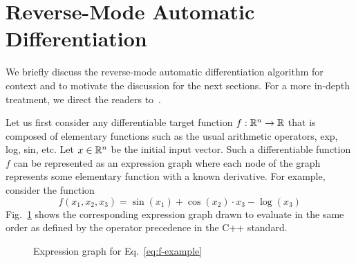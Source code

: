 \section{Reverse-Mode Automatic Differentiation}\label{sec:reverse}

We briefly discuss the reverse-mode automatic differentiation algorithm
for context and to motivate the discussion for the next sections.
For a more in-depth treatment, we direct the readers 
to~\cite{carpenter:2015}\cite{margossian:2018}\cite{griewank:2008}.

Let us first consider any differentiable target function $f: \mathbb{R}^n \to \mathbb{R}$
that is composed of elementary functions such as the usual arithmetic operators,
exp, log, sin, etc.
Let $x \in \mathbb{R}^n$ be the initial input vector.
Such a differentiable function $f$ can be represented as an expression graph
where each node of the graph represents some elementary function with a known derivative.
For example, consider the function 
\begin{equation}
    f(x_1, x_2, x_3) = \sin(x_1) + \cos(x_2) \cdot x_3 - \log(x_3)
    \label{eq:f-example}
\end{equation}
Fig.~\ref{fig:expr-example} shows the corresponding expression graph
drawn to evaluate in the same order as defined by the operator precedence in the C++ standard.

\begin{figure}[t]
\centering
{}

\caption{Expression graph for Eq.~\ref{eq:f-example}}\label{fig:expr-example}

\end{figure}

